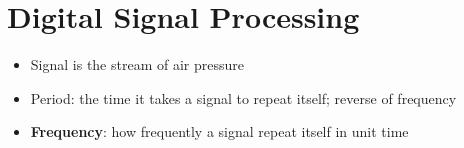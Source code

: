 \chapter{Digital Signal Processing}

\begin{itemize}
  \item Signal is the stream of air pressure
  \item Period: the time it takes a signal to repeat itself; reverse of
  frequency
  \item \textbf{Frequency}: how frequently a signal repeat itself in unit time
\end{itemize}

